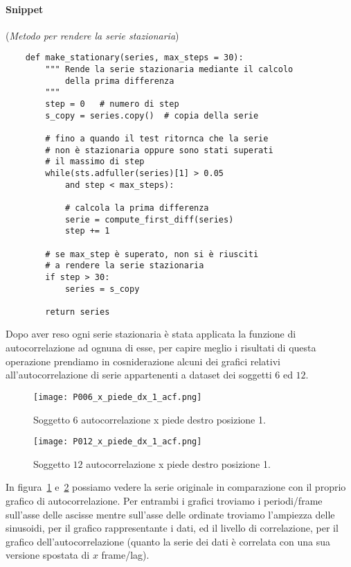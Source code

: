 \paragraph*{Snippet} (\textit{Metodo per rendere la serie stazionaria})
\begin{verbatim}
    def make_stationary(series, max_steps = 30):
        """ Rende la serie stazionaria mediante il calcolo
            della prima differenza
        """
        step = 0   # numero di step
        s_copy = series.copy()  # copia della serie
        
        # fino a quando il test ritornca che la serie
        # non è stazionaria oppure sono stati superati
        # il massimo di step
        while(sts.adfuller(series)[1] > 0.05 
            and step < max_steps):
            
            # calcola la prima differenza
            serie = compute_first_diff(series)
            step += 1

        # se max_step è superato, non si è riusciti
        # a rendere la serie stazionaria
        if step > 30:
            series = s_copy

        return series
\end{verbatim}

\begin{sloppypar}
Dopo aver reso ogni serie stazionaria è stata applicata la funzione di autocorrelazione ad ognuna di
esse, per capire meglio i risultati di questa operazione prendiamo in cosniderazione alcuni dei 
grafici relativi all'autocorrelazione di serie appartenenti a dataset dei soggetti $6$ ed $12$.
\end{sloppypar}

\begin{figure}[H]
    \centering
    \texttt{[image: P006\_x\_piede\_dx\_1\_acf.png]}
    \caption{Soggetto $6$ autocorrelazione x piede destro posizione 1.}
    \label{fig:P006_x_piede_dx_1_acf}
\end{figure}

\begin{figure}[H]
    \centering
    \texttt{[image: P012\_x\_piede\_dx\_1\_acf.png]}
    \caption{Soggetto $12$ autocorrelazione x piede destro posizione 1.}
    \label{fig:P012_x_piede_dx_1_acf}
\end{figure}

In figura~\ref{fig:P006_x_piede_dx_1_acf} e~\ref{fig:P012_x_piede_dx_1_acf} possiamo vedere
la serie originale in comparazione con il proprio grafico di autocorrelazione. Per entrambi
i grafici troviamo i periodi/frame sull'asse delle ascisse mentre sull'asse delle ordinate 
troviamo l'ampiezza delle sinusoidi, per il grafico rappresentante i dati, ed il livello 
di correlazione, per il grafico dell'autocorrelazione (quanto la serie dei dati è correlata
con una sua versione spostata di $x$ frame/lag).

